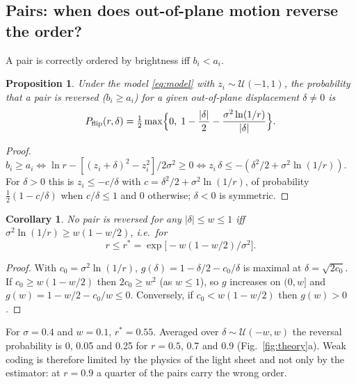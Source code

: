\documentclass[11pt]{article}
\newtheorem{proposition}{Proposition}
\newtheorem{corollary}{Corollary}
\theoremstyle{remark}
\begin{document}
\subsection{Pairs: when does out-of-plane motion reverse the order?}
A pair is correctly ordered by brightness iff $b_i<a_i$.
\begin{proposition}\label{prop:flip}
Under the model \eqref{eq:model} with $z_i\sim\mathcal U(-1,1)$, the probability that a pair is reversed ($b_i\ge a_i$) for a given out-of-plane displacement $\delta\neq0$ is
\begin{equation}
P_\mathrm{flip}(r,\delta)=\tfrac12\max\Bigl\{0,\;1-\frac{|\delta|}{2}-\frac{\sigma^2\ln(1/r)}{|\delta|}\Bigr\}.
\label{eq:flip}
\end{equation}
\end{proposition}
\begin{proof}
$b_i\ge a_i \iff \ln r-[(z_i+\delta)^2-z_i^2]/2\sigma^2\ge0 \iff z_i\,\delta\le-(\delta^2/2+\sigma^2\ln(1/r))$.
For $\delta>0$ this is $z_i\le-c/\delta$ with $c=\delta^2/2+\sigma^2\ln(1/r)$, of probability $\frac12(1-c/\delta)$ when $c/\delta\le1$ and 0 otherwise; $\delta<0$ is symmetric.
\end{proof}
\begin{corollary}\label{cor:rstar}
No pair is reversed for any $|\delta|\le w\le1$ iff $\sigma^2\ln(1/r)\ge w(1-w/2)$, i.e.\ for
\begin{equation}
r\le r^\ast=\exp\!\bigl[-w(1-w/2)/\sigma^2\bigr].
\end{equation}
\end{corollary}
\begin{proof}
With $c_0=\sigma^2\ln(1/r)$, $g(\delta)=1-\delta/2-c_0/\delta$ is maximal at $\delta=\sqrt{2c_0}$. If $c_0\ge w(1-w/2)$ then $2c_0\ge w^2$ (as $w\le1$), so $g$ increases on $(0,w]$ and $g(w)=1-w/2-c_0/w\le0$. Conversely, if $c_0<w(1-w/2)$ then $g(w)>0$.
\end{proof}
For $\sigma=0.4$ and $w=0.1$, $r^\ast=0.55$.
Averaged over $\delta\sim\mathcal U(-w,w)$ the reversal probability is 0, 0.05 and 0.25 for $r=0.5$, 0.7 and 0.9 (Fig.~\ref{fig:theory}a).
Weak coding is therefore limited by the physics of the light sheet and not only by the estimator: at $r=0.9$ a quarter of the pairs carry the wrong order.
\end{document}
